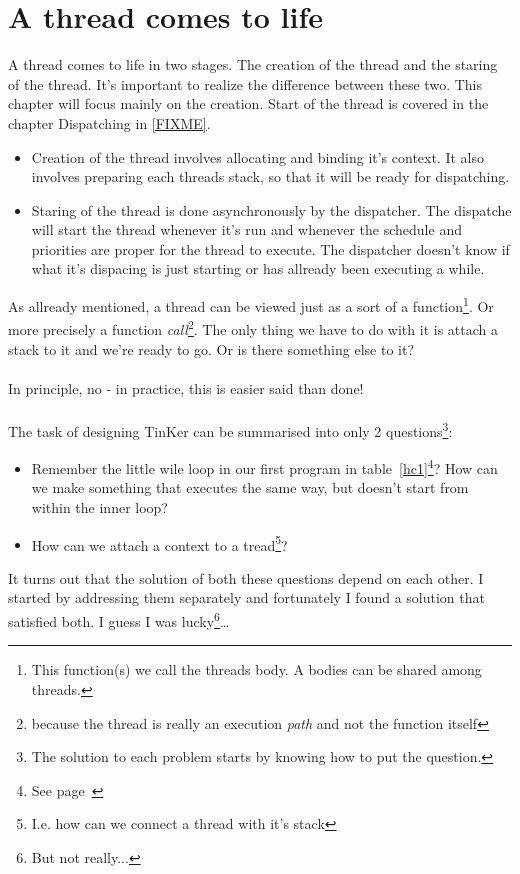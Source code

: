 \chapter{A thread comes to life}{
A thread comes to life in two stages. The creation of the thread and the staring of the thread. It's important to realize the difference between these two. This chapter will focus mainly on the creation. Start of the thread is covered in the chapter Dispatching in \ref{FIXME}.

\begin{itemize}
	\item Creation of the thread involves allocating and binding it's context. It also involves preparing each threads stack, so that it will be ready for dispatching.
	\item Staring of the thread is done asynchronously by the dispatcher. The dispatche will start the thread whenever it's run and whenever the schedule and priorities are proper for the thread to execute. The dispatcher doesn't know if what it's dispacing is just starting or has allready been executing a while.
\end{itemize}

As allready mentioned, a thread can be viewed just as a sort of a function\footnote{This function(s) we call the threads body. A bodies can be shared among threads.}. Or more precisely a function \textit{call}\footnote{because the thread is really an execution \textit{path} and not the function itself}. The only thing we have to do with it is attach a stack to it and we're ready to go. Or is there something else to it?
\\\\In principle, no - in practice, this is easier said than done!
\\\\The task of designing TinKer can be summarised into only 2 questions\footnote{The solution to each problem starts by knowing how to put the question.}:
\begin{itemize}
	\item Remember the little wile loop in our first program in table~\ref{hc1}\footnote{See page~\pageref{hc1} }? How can we make something that executes the same way, but doesn't start from within the inner loop?
	\item How can we attach a context to a tread\footnote{I.e. how can we connect a thread with it's stack}?
\end{itemize}
It turns out that the solution of both these questions depend on each other. I started by addressing them separately and fortunately I found a solution that satisfied both. I guess I was lucky\footnote{But not really...}\ldots


}
